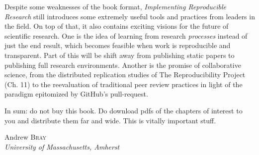 \documentclass[12pt]{article}
\newenvironment{references}{
  \begin{center} \textsf{REFERENCES} \end{center}
  \begin{list}{}{\topsep=0pt\parsep=0pt\baselineskip=20pt
   \leftmargin=1.5em\itemindent=-\leftmargin}}
  {\end{list}}
\begin{document}
Despite some weaknesses of the book format, \emph{Implementing Reproducible
Research} still introduces some extremely useful tools and practices from leaders in 
the field.  On top of that, it also contains exciting visions for the future of scientific research.
One is the idea of learning from research \emph{processes} instead of just the 
end result, which becomes feasible when work is reproducible and transparent.
Part of this will be shift away from publishing static papers to publishing full research
environments.  Another is the promise of collaborative science, from the distributed
replication studies of The Reproducibility Project (Ch. 11) to the reevaluation of traditional 
peer review practices in light of the paradigm epitomized by GitHub's pull-request.

In sum: do not buy this book. Do download pdfs of the chapters of interest to you
and distribute them far and wide. This is vitally important stuff.



\begin{flushright}\def\baselinestretch{1}
Andrew \textsc{Bray}\\
\emph{University of Massachusetts, Amherst}

\end{flushright}


%
\end{document}
